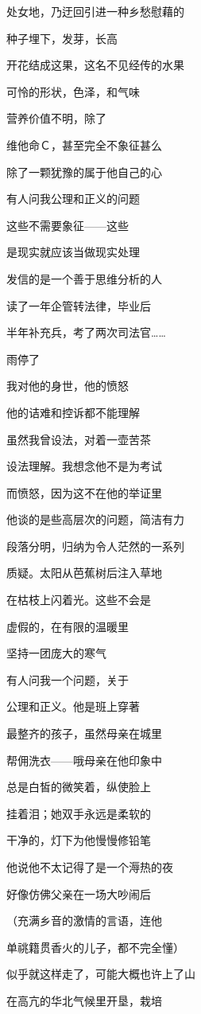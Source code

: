 处女地，乃迂回引进一种乡愁慰藉的

种子埋下，发芽，长高

开花结成这果，这名不见经传的水果

可怜的形状，色泽，和气味

营养价值不明，除了

维他命Ｃ，甚至完全不象征甚么

除了一颗犹豫的属于他自己的心



有人问我公理和正义的问题

这些不需要象征——这些

是现实就应该当做现实处理

发信的是一个善于思维分析的人

读了一年企管转法律，毕业后

半年补充兵，考了两次司法官……

雨停了

我对他的身世，他的愤怒

他的诘难和控诉都不能理解

虽然我曾设法，对着一壶苦茶

设法理解。我想念他不是为考试

而愤怒，因为这不在他的举证里

他谈的是些高层次的问题，简洁有力

段落分明，归纳为令人茫然的一系列

质疑。太阳从芭蕉树后注入草地

在枯枝上闪着光。这些不会是

虚假的，在有限的温暖里

坚持一团庞大的寒气



有人问我一个问题，关于

公理和正义。他是班上穿著

最整齐的孩子，虽然母亲在城里

帮佣洗衣——哦母亲在他印象中

总是白皙的微笑着，纵使脸上

挂着泪；她双手永远是柔软的

干净的，灯下为他慢慢修铅笔

他说他不太记得了是一个溽热的夜

好像仿佛父亲在一场大吵闹后

（充满乡音的激情的言语，连他

单祧籍贯香火的儿子，都不完全懂）

似乎就这样走了，可能大概也许上了山

在高亢的华北气候里开垦，栽培

